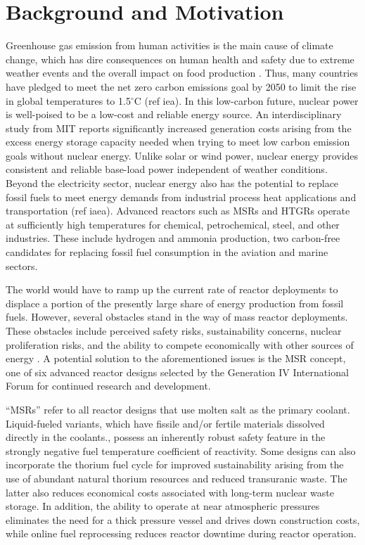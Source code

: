 \section{Background and Motivation}

Greenhouse gas emission from human activities is the main cause of climate
change, which has dire consequences on human health and safety due to extreme
weather events and the overall impact on food production
\cite{mcmichael_global_2004}. Thus, many countries have pledged to meet the
net zero carbon emissions goal by 2050 to limit the rise in global temperatures
to 1.5$^{\circ}$C (ref iea). In this low-carbon future, nuclear power is
well-poised to be a low-cost and reliable energy source.
An interdisciplinary study from \gls{MIT}
\cite{petti_future_2018} reports significantly increased generation costs
arising from the excess energy storage capacity needed when trying to meet low
carbon emission goals without nuclear energy. Unlike solar or wind power,
nuclear energy provides consistent and reliable base-load power independent of
weather conditions. Beyond the electricity sector, nuclear energy also has the
potential to replace fossil fuels to meet energy demands from industrial
process heat applications and transportation (ref iaea).
Advanced reactors such as \glspl{MSR} and \glspl{HTGR} operate at sufficiently
high temperatures for chemical, petrochemical, steel, and other industries.
These include hydrogen and ammonia production, two carbon-free candidates for
replacing fossil fuel consumption in the aviation and marine sectors.

The world would have to ramp up the current rate of reactor deployments to
displace a portion of the presently large share of energy production from
fossil fuels. However, several obstacles stand in the way of mass
reactor deployments. These obstacles include perceived safety risks,
sustainability concerns, nuclear proliferation
risks, and the ability to compete economically with other sources of energy
\cite{massachusetts_institute_of_technology_future_2003}. A potential solution
to the aforementioned issues is the \gls{MSR} concept, one of six advanced
reactor designs selected by the Generation IV International Forum
\cite{gif_technology_2002} for continued research and development.

``\glspl{MSR}'' refer to all reactor designs that use molten salt as the
primary coolant. Liquid-fueled variants, which have fissile and/or fertile
materials dissolved directly in the coolants.,
possess an inherently robust safety feature in the strongly negative fuel
temperature coefficient of reactivity. Some designs can also incorporate the
thorium fuel cycle for improved sustainability arising from the use of
abundant natural thorium resources and reduced transuranic waste. The
latter also reduces economical costs
associated with long-term nuclear waste storage. In addition, the ability to
operate at near atmospheric pressures eliminates the need for a thick pressure
vessel and drives down construction costs, while online fuel reprocessing
reduces reactor downtime during reactor operation.

